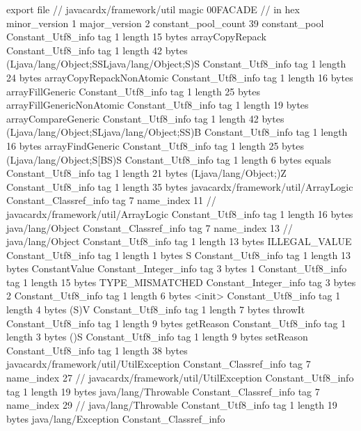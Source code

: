 export file {		// javacardx/framework/util
	magic	00FACADE		 // in hex
	minor_version	1
	major_version	2
	constant_pool_count	39
	constant_pool {
		Constant_Utf8_info {
			tag	1
			length	15
			bytes	arrayCopyRepack
		}
		Constant_Utf8_info {
			tag	1
			length	42
			bytes	(Ljava/lang/Object;SSLjava/lang/Object;S)S
		}
		Constant_Utf8_info {
			tag	1
			length	24
			bytes	arrayCopyRepackNonAtomic
		}
		Constant_Utf8_info {
			tag	1
			length	16
			bytes	arrayFillGeneric
		}
		Constant_Utf8_info {
			tag	1
			length	25
			bytes	arrayFillGenericNonAtomic
		}
		Constant_Utf8_info {
			tag	1
			length	19
			bytes	arrayCompareGeneric
		}
		Constant_Utf8_info {
			tag	1
			length	42
			bytes	(Ljava/lang/Object;SLjava/lang/Object;SS)B
		}
		Constant_Utf8_info {
			tag	1
			length	16
			bytes	arrayFindGeneric
		}
		Constant_Utf8_info {
			tag	1
			length	25
			bytes	(Ljava/lang/Object;S[BS)S
		}
		Constant_Utf8_info {
			tag	1
			length	6
			bytes	equals
		}
		Constant_Utf8_info {
			tag	1
			length	21
			bytes	(Ljava/lang/Object;)Z
		}
		Constant_Utf8_info {
			tag	1
			length	35
			bytes	javacardx/framework/util/ArrayLogic
		}
		Constant_Classref_info {
			tag	7
			name_index	11		// javacardx/framework/util/ArrayLogic
		}
		Constant_Utf8_info {
			tag	1
			length	16
			bytes	java/lang/Object
		}
		Constant_Classref_info {
			tag	7
			name_index	13		// java/lang/Object
		}
		Constant_Utf8_info {
			tag	1
			length	13
			bytes	ILLEGAL_VALUE
		}
		Constant_Utf8_info {
			tag	1
			length	1
			bytes	S
		}
		Constant_Utf8_info {
			tag	1
			length	13
			bytes	ConstantValue
		}
		Constant_Integer_info {
			tag	3
			bytes	1
		}
		Constant_Utf8_info {
			tag	1
			length	15
			bytes	TYPE_MISMATCHED
		}
		Constant_Integer_info {
			tag	3
			bytes	2
		}
		Constant_Utf8_info {
			tag	1
			length	6
			bytes	<init>
		}
		Constant_Utf8_info {
			tag	1
			length	4
			bytes	(S)V
		}
		Constant_Utf8_info {
			tag	1
			length	7
			bytes	throwIt
		}
		Constant_Utf8_info {
			tag	1
			length	9
			bytes	getReason
		}
		Constant_Utf8_info {
			tag	1
			length	3
			bytes	()S
		}
		Constant_Utf8_info {
			tag	1
			length	9
			bytes	setReason
		}
		Constant_Utf8_info {
			tag	1
			length	38
			bytes	javacardx/framework/util/UtilException
		}
		Constant_Classref_info {
			tag	7
			name_index	27		// javacardx/framework/util/UtilException
		}
		Constant_Utf8_info {
			tag	1
			length	19
			bytes	java/lang/Throwable
		}
		Constant_Classref_info {
			tag	7
			name_index	29		// java/lang/Throwable
		}
		Constant_Utf8_info {
			tag	1
			length	19
			bytes	java/lang/Exception
		}
		Constant_Classref_info {
}}}
